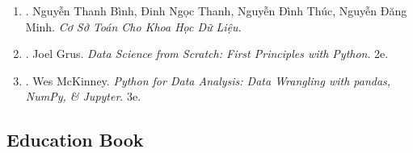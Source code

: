 \documentclass{article}
\begin{document}
\begin{enumerate}
	\item \cite{Binh_Thanh_Thuc_Minh_math_DS}. {\sc Nguyễn Thanh Bình, Đinh Ngọc Thanh, Nguyễn Đình Thúc, Nguyễn Đăng Minh}. {\it Cơ Sở Toán Cho Khoa Học Dữ Liệu}.\hfill{\sf[reading]}

	\item \cite{Grus2019}. {\sc Joel Grus}. {\it Data Science from Scratch: First Principles with Python}. 2e.\hfill{\sf[reading]}

	\item \cite{McKinney2022}. {\sc Wes McKinney}. {\it Python for Data Analysis: Data Wrangling with pandas, NumPy, \& Jupyter}. 3e. \hfill{\sf[reading]}
\end{enumerate}


\subsection{Education Book}
\end{document}

